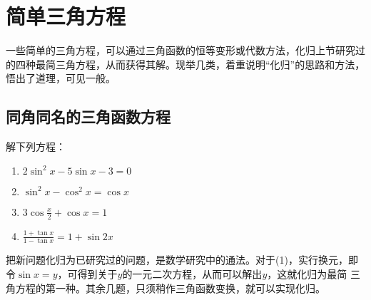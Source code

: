 \section{简单三角方程}
一些简单的三角方程，可以通过三角函数的恒等变形或代数方法，化归上节研究过的四种最简三角方程，从而获得其解。现举几类，着重说明“化归”的思路和方法，悟出了道理，可见一般。

\subsection{同角同名的三角函数方程}
\begin{example}
   解下列方程： 
\begin{multicols}{2}
\begin{enumerate}[(1)]
    \item $2\sin^2 x-5\sin x-3=0$
    \item $\sin^2 x-\cos^2 x=\cos x$
    \item $3\cos\frac{x}{2}+\cos x=1$
    \item $\frac{1+\tan x}{1-\tan x}=1+\sin 2x$
\end{enumerate}
\end{multicols}
\end{example}

\begin{analyze}
把新问题化归为已研究过的问题，是数学研究中的通法。对于(1)，实行换元，即令$\sin x=y$，可得到关于$y$的一元二次方程，从而可以解出$y$，这就化归为最简 三角方程的第一种。其余几题，只须稍作三角函数变换，就可以实现化归。
\end{analyze}

